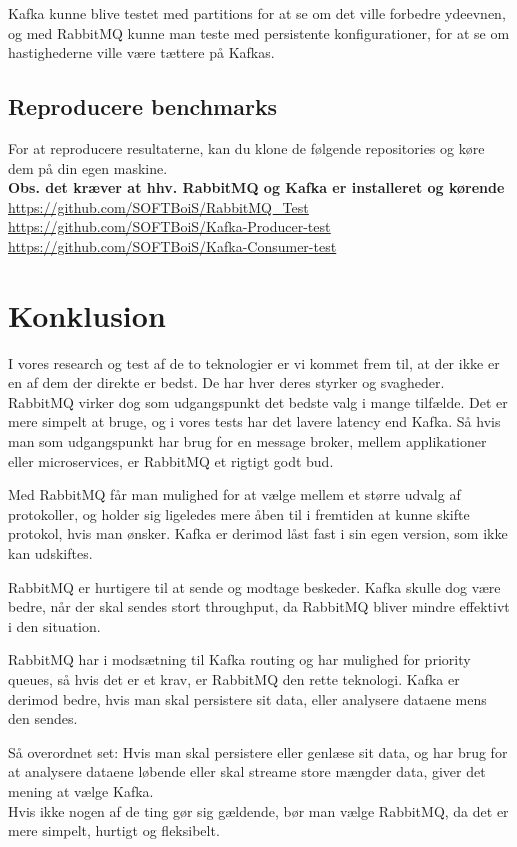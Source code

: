 \documentclass[
]{article}
\begin{document}
Kafka kunne blive testet med partitions for at se om det ville forbedre
ydeevnen, og med RabbitMQ kunne man teste med persistente
konfigurationer, for at se om hastighederne ville være tættere på
Kafkas.

\hypertarget{reproducere-benchmarks}{%
\subsection{Reproducere benchmarks}\label{reproducere-benchmarks}}

For at reproducere resultaterne, kan du klone de følgende repositories
og køre dem på din egen maskine.\\
\textbf{Obs. det kræver at hhv. RabbitMQ og Kafka er installeret og
kørende}\\
\href{https://github.com/SOFTBoiS/RabbitMQ_Test}{\underline{https://github.com/SOFTBoiS/RabbitMQ\_Test}}\\
\href{https://github.com/SOFTBoiS/Kafka-Producer-test}{\underline{https://github.com/SOFTBoiS/Kafka-Producer-test}}\\
\href{https://github.com/SOFTBoiS/Kafka-Consumer-test}{\underline{https://github.com/SOFTBoiS/Kafka-Consumer-test}}

\hypertarget{konklusion}{%
\section{Konklusion}\label{konklusion}}

I vores research og test af de to teknologier er vi kommet frem til, at
der ikke er en af dem der direkte er bedst. De har hver deres styrker og
svagheder.\\
RabbitMQ virker dog som udgangspunkt det bedste valg i mange tilfælde.
Det er mere simpelt at bruge, og i vores tests har det lavere latency
end Kafka. Så hvis man som udgangspunkt har brug for en message broker,
mellem applikationer eller microservices, er RabbitMQ et rigtigt godt
bud.

Med RabbitMQ får man mulighed for at vælge mellem et større udvalg af
protokoller, og holder sig ligeledes mere åben til i fremtiden at kunne
skifte protokol, hvis man ønsker. Kafka er derimod låst fast i sin egen
version, som ikke kan udskiftes.

RabbitMQ er hurtigere til at sende og modtage beskeder. Kafka skulle dog
være bedre, når der skal sendes stort throughput, da RabbitMQ bliver
mindre effektivt i den situation.

RabbitMQ har i modsætning til Kafka routing og har mulighed for priority
queues, så hvis det er et krav, er RabbitMQ den rette teknologi. Kafka
er derimod bedre, hvis man skal persistere sit data, eller analysere
dataene mens den sendes.

Så overordnet set: Hvis man skal persistere eller genlæse sit data, og
har brug for at analysere dataene løbende eller skal streame store
mængder data, giver det mening at vælge Kafka.\\
Hvis ikke nogen af de ting gør sig gældende, bør man vælge RabbitMQ, da
det er mere simpelt, hurtigt og fleksibelt.

\end{document}
